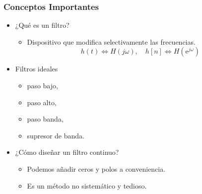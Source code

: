 \documentclass[handout]{beamer}
\author[J. Chacón]{%
\textit{Ingeniería Electrónica de Comunicaciones }\\
\vspace{0.6cm}
\small Jesús Chacón Sombría}%
\institute[DACYA. UCM] %
{

\footnotesize  Departamento de Arquitectura de Computadores y Automática.\\
  Universidad Complutense de Madrid
  }
\date[Diseño de filtros] %
{\footnotesize Curso 2025-2026}%
\newcommand{\MyLogo}{%
\begin{textblock}{14}(116.0,0.6)
  \pgfuseimage{logo}
\end{textblock}
}
\numberwithin{section}{part}
\begin{document}
\begin{frame}
  \titlepage
\end{frame}

\newcommand*\oldmacro{}%
\let\oldmacro\insertshorttitle%
\renewcommand*\insertshorttitle{%
 \MyLogo
  \oldmacro\hfill%
}

\AtBeginSection[]{}
\AtBeginSubsection[]{}





\begin{frame}
  \frametitle{Conceptos Importantes}
  \begin{itemize}
    \item \alert{¿Qué es un filtro?}
    \begin{itemize}
      \item Dispositivo que modifica selectivamente las frecuencias.
      \[
        h(t) \Leftrightarrow H(j\omega),
        \quad
        h[n] \Leftrightarrow H(\text{e}^{j\omega})
      \]
    \end{itemize}
    \item \alert{Filtros ideales}
    \begin{itemize}
      \item paso bajo,
      \item paso alto,
      \item paso banda,
      \item supresor de banda.
    \end{itemize}
    \vspace{0.2cm}

    \item \alert{¿Cómo diseñar un filtro continuo?}
    \begin{itemize}
      \item Podemos añadir ceros y polos a conveniencia.
      \item Es un método no sistemático y tedioso.
    \end{itemize}
  \end{itemize}

\end{frame}
\end{document}
